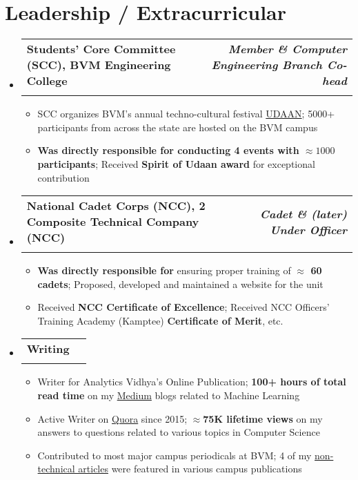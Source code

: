 \documentclass[letterpaper,11pt, ]{article}
\makeatletter
\newcommand{\resumeItem}[1]{
  \item[\bullet]\small{
    {#1 \vspace{-2pt}}
  }
}
\newcommand{\resumeResultItem}[1]{
  \item[\checkmark]\small{
    {#1 \vspace{-2pt}}
  }
}
\newcommand{\resumeSubheading}[4]{
  \vspace{-2pt}\item
    \begin{tabular*}{1.0\textwidth}[t]{l@{\extracolsep{\fill}}r}
      \textbf{#1} & \textbf{\small #2} \\
      \textit{\small#3} & \textit{\small #4} \\
    \end{tabular*}\vspace{-7pt}
}
\newcommand{\resumeSubHeadingListStart}{\begin{itemize}[leftmargin=0.0in, label={}]}
\newcommand{\resumeSubHeadingListEnd}{\end{itemize}}
\newcommand{\resumeItemListStart}{\begin{itemize}[leftmargin=10pt]}
\newcommand{\resumeItemListEnd}{\end{itemize}\vspace{-5pt}}
\makeatother
\begin{document}
\section{Leadership / Extracurricular}
    \resumeSubHeadingListStart
        \resumeSubheading{Students' Core Committee (SCC), BVM Engineering College}{ \textit{Member \& Computer  Engineering Branch Co-head}}{}{}
    \vspace{-15pt}
        \resumeItemListStart
            \resumeItem{SCC organizes BVM's annual techno-cultural festival \href{https://www.youtube.com/watch?v=qVKYQioCpzw}{UDAAN}; 5000+ participants from across the state are hosted on the BVM campus}
            \resumeResultItem{\textbf{Was directly responsible for conducting 4 events with  $\approx1000$ participants}; Received \textbf{Spirit of Udaan award} for exceptional contribution}
        \resumeItemListEnd
    \resumeSubheading{National Cadet Corps (NCC), 2 Composite Technical Company (NCC)}{\textit{Cadet \& (later) Under Officer}}{}{}
    \vspace{-15pt}
        \resumeItemListStart
            \resumeResultItem{\textbf{Was directly responsible for} ensuring  proper training of \textbf{$\approx$ 60 cadets}; Proposed, developed and maintained a website for the unit}
            \resumeResultItem{Received \textbf{NCC Certificate of Excellence}; Received NCC Officers' Training Academy (Kamptee) \textbf{Certificate of Merit}, etc.}
        \resumeItemListEnd

    \resumeSubheading{Writing}{}{}{}
    \vspace{-15pt}
        \resumeItemListStart
            \resumeResultItem{Writer for Analytics Vidhya's Online Publication; \textbf{100+ hours of total read time} on my \href{https://ivbhatt.medium.com/}{Medium} blogs related to Machine Learning}
            \resumeResultItem{Active Writer on \href{https://www.quora.com/profile/Ishan-Bhatt-21}{Quora} since 2015; \textbf{$\approx$75K lifetime views} on my answers to questions related to various topics in Computer Science}
            \resumeResultItem{Contributed to most major campus periodicals at BVM; 4 of my  \href{https://drive.google.com/drive/folders/1sOZIAW9ZOfXf0sClM-c1x2Be4pcSgcNG}{non-technical articles} were featured in various campus publications} 
            
        \resumeItemListEnd
    \resumeSubHeadingListEnd
\end{document}
